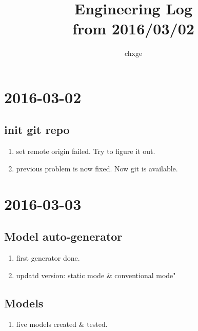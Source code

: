 \documentclass{ctexart}
\begin{document}
\title{%
	Engineering Log\\ \small from 2016/03/02}
\author{%
	chxge}
\maketitle

\tableofcontents
	
\section[03/02]{2016-03-02}
	\subsection{init git repo}
		\begin{enumerate}
			\item <21:11>set remote origin failed. Try to figure it out.
			\item <21:16>previous problem is now fixed. Now git is available.
		\end{enumerate}
\section[03/03]{2016-03-03}
	\subsection{Model auto-generator}
		\begin{enumerate}
			\item <18:55>first generator done.
			\item <19:32>updatd version: static mode & conventional mode"
		\end{enumerate}
	\subsection{Models}
		\begin{enumerate}
			\item <20:28>five models created & tested.
		\end{enumerate}
\end{document}
